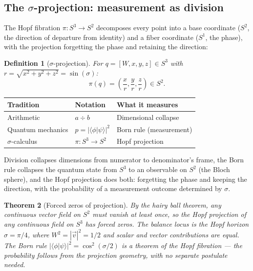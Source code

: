 \documentclass[12pt]{article}
\newtheorem{theorem}{Theorem}[section]
\newtheorem{definition}[theorem]{Definition}
\begin{document}
\subsection{The $\sigma$-projection: measurement as division}

The Hopf fibration $\pi: S^3 \to S^2$ decomposes every point into a base coordinate ($S^2$, the direction of departure from identity) and a fiber coordinate ($S^1$, the phase), with the projection forgetting the phase and retaining the direction:

\begin{definition}[$\sigma$-projection]
    For $q = [W, x, y, z] \in S^3$ with $r = \sqrt{x^2 + y^2 + z^2} = \sin(\sigma)$:
    \begin{equation}
        \pi(q) = \left(\frac{x}{r}, \frac{y}{r}, \frac{z}{r}\right) \in S^2.
    \end{equation}
\end{definition}

\begin{center}
\begin{tabular}{l l l}
    \toprule
    Tradition & Notation & What it measures \\
    \midrule
    Arithmetic & $a \div b$ & Dimensional collapse \\[4pt]
    Quantum mechanics & $p = |\langle\phi|\psi\rangle|^2$ & Born rule (measurement) \\[4pt]
    $\sigma$-calculus & $\pi: S^3 \to S^2$ & Hopf projection \\
    \bottomrule
\end{tabular}
\end{center}

Division collapses dimensions from numerator to denominator's frame, the Born rule collapses the quantum state from $S^3$ to an observable on $S^2$ (the Bloch sphere), and the Hopf projection does both: forgetting the phase and keeping the direction, with the probability of a measurement outcome determined by $\sigma$.

\begin{theorem}[Forced zeros of projection]
    By the hairy ball theorem, any continuous vector field on $S^2$ must vanish at least once, so the Hopf projection of any continuous field on $S^3$ has forced zeros. The balance locus is the Hopf horizon $\sigma = \pi/4$, where $W^2 = |\vec{v}|^2 = 1/2$ and scalar and vector contributions are equal. The Born rule $|\langle\phi|\psi\rangle|^2 = \cos^2(\sigma/2)$ is a theorem of the Hopf fibration --- the probability follows from the projection geometry, with no separate postulate needed.
\end{theorem}
\end{document}
